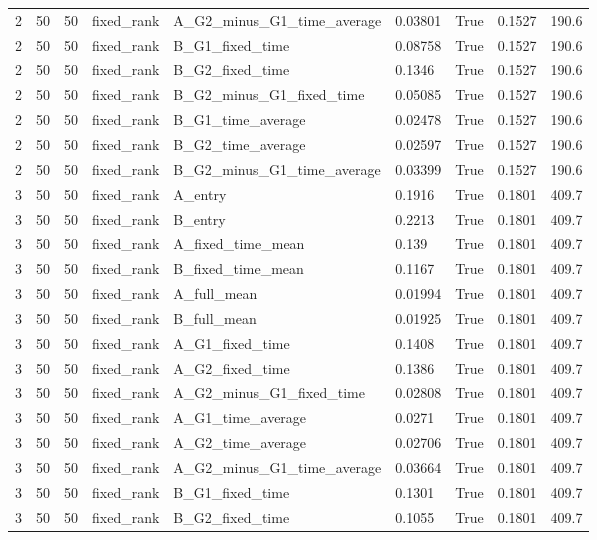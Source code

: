 \begin{longtable}{lllllllll}
2 & 50 & 50 & fixed\_rank & A\_G2\_minus\_G1\_time\_average & 0.03801 & True & 0.1527 & 190.6 \\
2 & 50 & 50 & fixed\_rank & B\_G1\_fixed\_time & 0.08758 & True & 0.1527 & 190.6 \\
2 & 50 & 50 & fixed\_rank & B\_G2\_fixed\_time & 0.1346 & True & 0.1527 & 190.6 \\
2 & 50 & 50 & fixed\_rank & B\_G2\_minus\_G1\_fixed\_time & 0.05085 & True & 0.1527 & 190.6 \\
2 & 50 & 50 & fixed\_rank & B\_G1\_time\_average & 0.02478 & True & 0.1527 & 190.6 \\
2 & 50 & 50 & fixed\_rank & B\_G2\_time\_average & 0.02597 & True & 0.1527 & 190.6 \\
2 & 50 & 50 & fixed\_rank & B\_G2\_minus\_G1\_time\_average & 0.03399 & True & 0.1527 & 190.6 \\
3 & 50 & 50 & fixed\_rank & A\_entry & 0.1916 & True & 0.1801 & 409.7 \\
3 & 50 & 50 & fixed\_rank & B\_entry & 0.2213 & True & 0.1801 & 409.7 \\
3 & 50 & 50 & fixed\_rank & A\_fixed\_time\_mean & 0.139 & True & 0.1801 & 409.7 \\
3 & 50 & 50 & fixed\_rank & B\_fixed\_time\_mean & 0.1167 & True & 0.1801 & 409.7 \\
3 & 50 & 50 & fixed\_rank & A\_full\_mean & 0.01994 & True & 0.1801 & 409.7 \\
3 & 50 & 50 & fixed\_rank & B\_full\_mean & 0.01925 & True & 0.1801 & 409.7 \\
3 & 50 & 50 & fixed\_rank & A\_G1\_fixed\_time & 0.1408 & True & 0.1801 & 409.7 \\
3 & 50 & 50 & fixed\_rank & A\_G2\_fixed\_time & 0.1386 & True & 0.1801 & 409.7 \\
3 & 50 & 50 & fixed\_rank & A\_G2\_minus\_G1\_fixed\_time & 0.02808 & True & 0.1801 & 409.7 \\
3 & 50 & 50 & fixed\_rank & A\_G1\_time\_average & 0.0271 & True & 0.1801 & 409.7 \\
3 & 50 & 50 & fixed\_rank & A\_G2\_time\_average & 0.02706 & True & 0.1801 & 409.7 \\
3 & 50 & 50 & fixed\_rank & A\_G2\_minus\_G1\_time\_average & 0.03664 & True & 0.1801 & 409.7 \\
3 & 50 & 50 & fixed\_rank & B\_G1\_fixed\_time & 0.1301 & True & 0.1801 & 409.7 \\
3 & 50 & 50 & fixed\_rank & B\_G2\_fixed\_time & 0.1055 & True & 0.1801 & 409.7 \\

\end{longtable}
